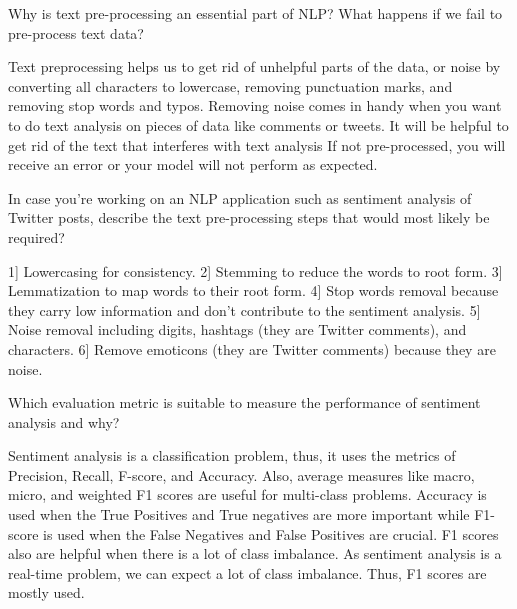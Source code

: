 	\begin{qanda}
		\begin{question}
Why is text pre-processing an essential part of NLP? What happens if we fail to pre-process text data?
		\end{question}
		\begin{answer}
Text preprocessing helps us to get rid of unhelpful parts of the data, or noise by converting all characters to lowercase, removing punctuation marks, and removing stop words and typos. Removing noise comes in handy when you want to do text analysis on pieces of data like comments or tweets. It will be helpful to get rid of the text that interferes with text analysis If not pre-processed, you will receive an error or your model will not perform as expected.
		\end{answer}
	\end{qanda}

	\begin{qanda}
		\begin{question}
In case you're working on an NLP application such as sentiment analysis of Twitter posts, describe the text pre-processing steps that would most likely be required?
		\end{question}
		\begin{answer}
1] Lowercasing for consistency. 2] Stemming to reduce the words to root form. 3] Lemmatization to map words to their root form. 4] Stop words removal because they carry low information and don't contribute to the sentiment analysis. 5] Noise removal including digits, hashtags (they are Twitter comments), and characters. 6] Remove emoticons (they are Twitter comments) because they are noise.
		\end{answer}
	\end{qanda}

	\begin{qanda}
		\begin{question}
Which evaluation metric is suitable to measure the performance of sentiment analysis and why?
		\end{question}
		\begin{answer}
Sentiment analysis is a classification problem, thus, it uses the metrics of Precision, Recall, F-score, and Accuracy. Also, average measures like macro, micro, and weighted F1 scores are useful for multi-class problems. Accuracy is used when the True Positives and True negatives are more important while F1-score is used when the False Negatives and False Positives are crucial. F1 scores also are helpful when there is a lot of class imbalance. As sentiment analysis is a real-time problem, we can expect a lot of class imbalance. Thus, F1 scores are mostly used.
		\end{answer}
	\end{qanda}

